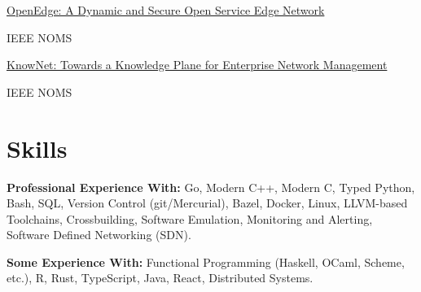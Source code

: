 \documentclass[10pt]{article}
\newcommand{\publication}[3]{%
    \parbox[t][][t]{.8\linewidth}{ #1 }%
    \parbox[t][][t]{.15\linewidth}{ #2 }%
    \parbox[t][][t]{.05\linewidth}{\raggedleft #3 }%
    \vspace{0.5ex}
}
\begin{document}
\publication%
    {\small%
     \href{https://doi.org/10.1109/NOMS.2016.7502820}%
          {OpenEdge: A Dynamic and Secure Open Service Edge Network}}%
    {IEEE NOMS}%
    {2016}

\publication%
    {\small%
     \href{https://doi.org/10.1109/NOMS.2016.7502819}%
          {KnowNet: Towards a Knowledge Plane for Enterprise Network Management}}%
    {IEEE NOMS}%
    {2016}

\section{Skills}

\begin{trivlist}
    \item \textbf{Professional Experience With:} Go, Modern C++, Modern C,
          Typed Python, Bash, SQL, Version Control (git/Mercurial), Bazel,
          Docker, Linux, LLVM-based Toolchains, Crossbuilding, Software
          Emulation, Monitoring and Alerting, Software Defined Networking
          (SDN).
    \item \textbf{Some Experience With:} Functional Programming
          (Haskell, OCaml, Scheme, etc.), R, Rust, TypeScript, Java, React,
          Distributed Systems.
\end{trivlist}
\end{document}
